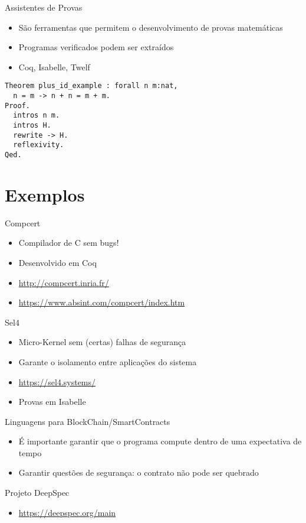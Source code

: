 \documentclass[presentation]{beamer}
\begin{document}
\begin{frame}[fragile,label={sec:org2acab98}]{Assistentes de Provas}
 \begin{itemize}
\item São ferramentas que permitem o desenvolvimento de provas matemáticas
\item Programas verificados podem ser extraídos
\item Coq, Isabelle, Twelf
\end{itemize}
\begin{verbatim}
Theorem plus_id_example : forall n m:nat,
  n = m -> n + n = m + m.
Proof.
  intros n m.
  intros H.
  rewrite -> H.
  reflexivity.
Qed.
\end{verbatim}
\end{frame}

\section{Exemplos}
\label{sec:org0ddce3a}

\begin{frame}[label={sec:org69d1e04}]{Compcert}
\begin{itemize}
\item Compilador de C sem bugs!
\item Desenvolvido em Coq
\item \url{http://compcert.inria.fr/}
\item \url{https://www.absint.com/compcert/index.htm}
\end{itemize}
\end{frame}

\begin{frame}[label={sec:orgf85fc76}]{Sel4}
\begin{itemize}
\item Micro-Kernel sem (certas) falhas de segurança
\item Garante o isolamento entre aplicações do sistema
\item \url{https://sel4.systems/}
\item Provas em Isabelle
\end{itemize}
\end{frame}

\begin{frame}[label={sec:org2d579af}]{Linguagens para BlockChain/SmartContracts}
\begin{itemize}
\item É importante garantir que o programa compute dentro de uma expectativa de tempo
\item Garantir questões de segurança: o contrato não pode ser quebrado
\end{itemize}
\end{frame}

\begin{frame}[label={sec:org16916b1}]{Projeto DeepSpec}
\begin{itemize}
\item \url{https://deepspec.org/main}
\end{itemize}
\end{frame}
\end{document}
